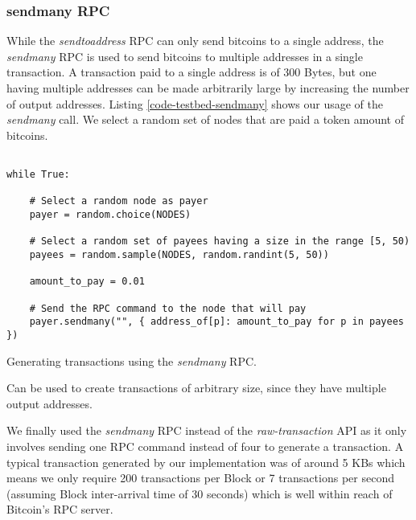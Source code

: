 \newpage
\subsubsection{sendmany RPC} 

While the \textit{sendtoaddress} RPC can only send bitcoins to a single address, the \textit{sendmany} RPC is used to send bitcoins to multiple addresses in a single transaction. A transaction paid to a single address is of 300 Bytes, but one having multiple addresses can be made arbitrarily large by increasing the number of output addresses. Listing \ref{code-testbed-sendmany} shows our usage of the \textit{sendmany} call. We select a random set of nodes that are paid a token amount of bitcoins. 

\begin{listing}[!htb]
    \begin{verbatim}

while True:

    # Select a random node as payer
    payer = random.choice(NODES)

    # Select a random set of payees having a size in the range [5, 50)
    payees = random.sample(NODES, random.randint(5, 50))

    amount_to_pay = 0.01

    # Send the RPC command to the node that will pay
    payer.sendmany("", { address_of[p]: amount_to_pay for p in payees })

    \end{verbatim}

    \caption[Generating transactions using the \textit{sendmany} RPC]
    {
        Generating transactions using the \textit{sendmany} RPC.

        \footnotesize
        Can be used to create transactions of arbitrary size, since they have multiple output addresses.
    }
    \label{code-testbed-sendmany}
\end{listing}

We finally used the \textit{sendmany} RPC instead of the \textit{raw-transaction} API as it only involves sending one RPC command instead of four to generate a transaction. A typical transaction generated by our implementation was of around 5 KBs which means we only require 200 transactions per Block or 7 transactions per second (assuming Block inter-arrival time of 30 seconds) which is well within reach of Bitcoin's RPC server.


